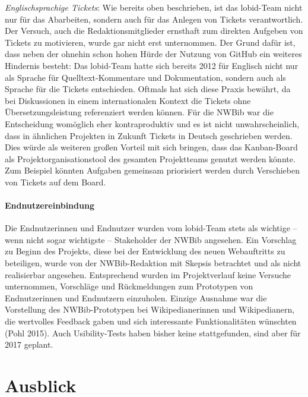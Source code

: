 \documentclass[a4paper,
fontsize=11pt,
oneside,
numbers=noperiodatend,
parskip=half-,
bibliography=totoc,
final
]{scrartcl}
\begin{document}
\emph{Englischsprachige Tickets}: Wie bereits oben beschrieben, ist das
lobid-Team nicht nur für das Abarbeiten, sondern auch für das Anlegen
von Tickets verantwortlich. Der Versuch, auch die Redaktionsmitglieder
ernsthaft zum direkten Aufgeben von Tickets zu motivieren, wurde gar
nicht erst unternommen. Der Grund dafür ist, dass neben der ohnehin
schon hohen Hürde der Nutzung von GitHub ein weiteres Hindernis besteht:
Das lobid-Team hatte sich bereits 2012 für Englisch nicht nur als
Sprache für Quelltext-Kommentare und Dokumentation, sondern auch als
Sprache für die Tickets entschieden. Oftmals hat sich diese Praxis
bewährt, da bei Diskussionen in einem internationalen Kontext die
Tickets ohne Übersetzungsleistung referenziert werden können. Für die
NWBib war die Entscheidung womöglich eher kontraproduktiv und es ist
nicht unwahrscheinlich, dass in ähnlichen Projekten in Zukunft Tickets
in Deutsch geschrieben werden. Dies würde als weiteren großen Vorteil
mit sich bringen, dass das Kanban-Board als Projektorganisationstool des
gesamten Projektteams genutzt werden könnte. Zum Beispiel könnten
Aufgaben gemeinsam priorisiert werden durch Verschieben von Tickets auf
dem Board.

\paragraph{Endnutzereinbindung}\label{endnutzereinbindung}

Die Endnutzerinnen und Endnutzer wurden vom lobid-Team stets als
wichtige -- wenn nicht sogar wichtigste -- Stakeholder der NWBib
angesehen. Ein Vorschlag zu Beginn des Projekts, diese bei der
Entwicklung des neuen Webauftritts zu beteiligen, wurde von der
NWBib-Redaktion mit Skepsis betrachtet und als nicht realisierbar
angesehen. Entsprechend wurden im Projektverlauf keine Versuche
unternommen, Vorschläge und Rückmeldungen zum Prototypen von
Endnutzerinnen und Endnutzern einzuholen. Einzige Ausnahme war die
Vorstellung des NWBib-Prototypen bei Wikipedianerinnen und
Wikipedianern, die wertvolles Feedback gaben und sich interessante
Funktionalitäten wünschten (Pohl 2015). Auch Usibility-Tests haben
bisher keine stattgefunden, sind aber für 2017 geplant.

\section*{Ausblick}\label{ausblick}
\end{document}
